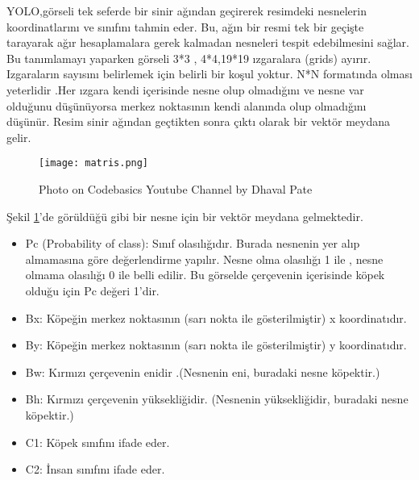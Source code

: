 \documentclass[11pt,a4paper]{report}
\begin{document}
\begin{justify}
\begin{justify}
   	YOLO,görseli tek seferde bir sinir ağından geçirerek resimdeki nesnelerin koordinatlarını ve sınıfını tahmin eder. Bu, ağın bir resmi tek bir geçişte tarayarak ağır hesaplamalara gerek kalmadan nesneleri tespit edebilmesini sağlar. Bu tanımlamayı yaparken görseli 3*3 , 4*4,19*19 ızgaralara (grids) ayırır. Izgaraların sayısını belirlemek için belirli bir koşul yoktur. N*N formatında olması yeterlidir .Her ızgara kendi içerisinde nesne olup olmadığını ve nesne var olduğunu düşünüyorsa merkez noktasının kendi alanında olup olmadığını düşünür. Resim sinir ağından geçtikten sonra çıktı olarak bir vektör meydana gelir.\cite{mediumcom}
   	\end{justify}
   \clearpage
   	\begin{figure}[!h]
   		\centering
   		\texttt{[image: matris.png]}
   		\caption{Photo on Codebasics Youtube Channel by Dhaval Pate}
   		\label{fig:ornek}
   	\end{figure}
   	Şekil \ref{fig:ornek}'de görüldüğü gibi bir nesne için bir vektör meydana gelmektedir.
   	
   		\begin{itemize}
   		\item Pc (Probability of class): Sınıf olasılığıdır. Burada nesnenin yer alıp almamasına göre değerlendirme yapılır. Nesne olma olasılığı 1 ile , nesne olmama olasılığı 0 ile belli edilir. Bu görselde çerçevenin içerisinde köpek olduğu için Pc değeri 1'dir.
   		
   		\item  Bx: Köpeğin merkez noktasının (sarı nokta ile gösterilmiştir) x koordinatıdır.
   		
   		\item  By: Köpeğin merkez noktasının (sarı nokta ile gösterilmiştir) y koordinatıdır.
   		
   		\item  Bw: Kırmızı çerçevenin enidir .(Nesnenin eni, buradaki nesne köpektir.)
   		
   		\item Bh: Kırmızı çerçevenin yüksekliğidir. (Nesnenin yüksekliğidir, buradaki nesne köpektir.)
   		
   		\item  C1: Köpek sınıfını ifade eder.
   		
   		\item  C2: İnsan sınıfını ifade eder.
   		
   	\end{itemize} 
     

\end{justify}
\end{document}
